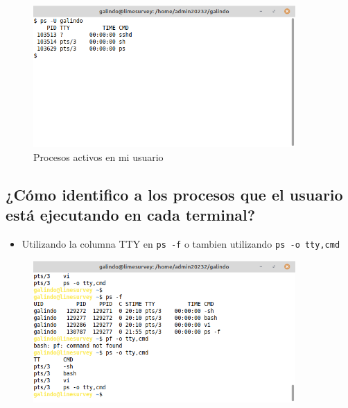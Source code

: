 \documentclass[11pt]{article}
\begin{document}
\begin{figure}[htbp]
\centering
\includegraphics[width=10cm]{img/psmu.png}
\caption{Procesos activos en mi usuario}
\end{figure}
\pagebreak

\subsection{¿Cómo identifico a los procesos que el usuario está ejecutando en cada terminal?}
\label{sec:org5f32837}
\begin{itemize}
\item Utilizando la columna TTY en \texttt{ps -f} o tambien utilizando \texttt{ps -o tty,cmd}
\end{itemize}

\begin{figure}[htbp]
\centering
\includegraphics[width=10cm]{img/tty.png}
\caption{}
\end{figure}
\end{document}
